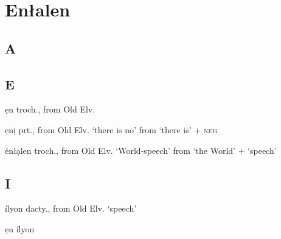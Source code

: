 \chapter{En\l alen}

\begin{multicols*}{2}

\section{A}

\section{E}

\begin{entrylist}
    \begin{dictentry}{ẹn}{
        troch., from Old Elv. 
    }\label{enl:en_L}
    \end{dictentry}
    \begin{dictentry}{ẹnị}{
        prt., from Old Elv.  `there is no' from  `there is' +  \textsc{neg}
    }\label{enl:eni_LL}
    \end{dictentry}
    \begin{dictentry}{énłạlen}{
        troch., from Old Elv.  `World-speech' from  `the World' +  `speech'
        }
        \label{enl:enLalen_HLM}
    \end{dictentry}
\end{entrylist}

\section{I}

\begin{entrylist}
    \begin{dictentry}{ílyon}{
        dacty., from Old Elv.  `speech'
    }\label{enl:ilyon_HM}
        \begin{entrysublist}
            \begin{simplentry}{ẹn ílyon}\label{enl:en_L_ilyon_HM}
            \end{simplentry}
        \end{entrysublist}
    \end{dictentry}
\end{entrylist}


\end{multicols*}
